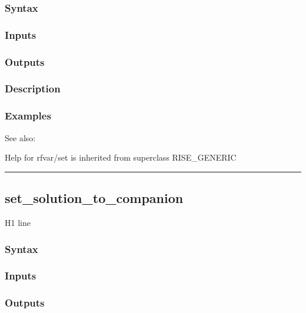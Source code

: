 \documentclass[letterpaper,10pt,english]{sphinxmanual}
\begin{document}
\subsubsection{Syntax}
\label{classes/models/@rfvar/rfvar:id108}

\subsubsection{Inputs}
\label{classes/models/@rfvar/rfvar:id109}

\subsubsection{Outputs}
\label{classes/models/@rfvar/rfvar:id110}

\subsubsection{Description}
\label{classes/models/@rfvar/rfvar:id111}

\subsubsection{Examples}
\label{classes/models/@rfvar/rfvar:id112}
See also:

Help for rfvar/set is inherited from superclass RISE\_GENERIC


\bigskip\hrule{}\bigskip



\subsection{set\_solution\_to\_companion}
\label{classes/models/@rfvar/rfvar:id113}\label{classes/models/@rfvar/rfvar:set-solution-to-companion}
H1 line


\subsubsection{Syntax}
\label{classes/models/@rfvar/rfvar:id114}

\subsubsection{Inputs}
\label{classes/models/@rfvar/rfvar:id115}

\subsubsection{Outputs}
\label{classes/models/@rfvar/rfvar:id116}
\end{document}
